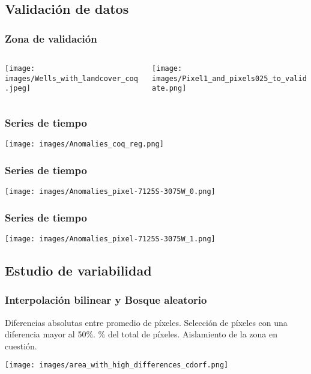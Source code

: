 \documentclass{beamer}
\begin{document}
  \subsection*{Validación de datos}

  \begin{frame}
    \frametitle{Zona de validación}

    \begin{columns}

      \begin{column}{0.5\textwidth}
        \centering
        \texttt{[image: images/Wells\_with\_landcover\_coq.jpeg]}
      \end{column}

      \begin{column}{0.5\textwidth}
        \centering
        \texttt{[image: images/Pixel1\_and\_pixels025\_to\_validate.png]}
      \end{column}

    \end{columns}
  \end{frame}

  \begin{frame}
    \frametitle{Series de tiempo}
    
    \centering
    \texttt{[image: images/Anomalies\_coq\_reg.png]}
  
  \end{frame}

  \begin{frame}
    \frametitle{Series de tiempo}
    
    \centering
    \texttt{[image: images/Anomalies\_pixel-7125S-3075W\_0.png]}
  \end{frame}

  \begin{frame}
    \frametitle{Series de tiempo}
    
    \centering
    \texttt{[image: images/Anomalies\_pixel-7125S-3075W\_1.png]}
  \end{frame}

  \subsection*{Estudio de variabilidad}

  \begin{frame}
    \frametitle{Interpolación bilinear y Bosque aleatorio}

    \begin{outline}
      \1 Diferencias absolutas entre promedio de píxeles.
        \2 Selección de píxeles con una diferencia mayor al 50\%.
          \% del total de píxeles.
      \1 Aislamiento de la zona en cuestión.
    \end{outline}

    \centering
    \texttt{[image: images/area\_with\_high\_differences\_cdorf.png]}

  \end{frame}
\end{document}
